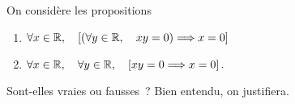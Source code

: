\documentclass{magnolia}
\begin{document}



On considère les propositions
\begin{enumerate}
\item $\forall x\in\mathbb{R} ,\quad \left[\left(\forall y\in\mathbb{R} ,\quad xy=0\right) \Longrightarrow x=0\right]$
\item $\forall x\in\mathbb{R} ,\quad \forall y\in\mathbb{R} ,\quad \left[xy=0 \Longrightarrow x=0\right].$
\end{enumerate}
Sont-elles vraies ou fausses~? Bien entendu, on justifiera.
\end{document}
